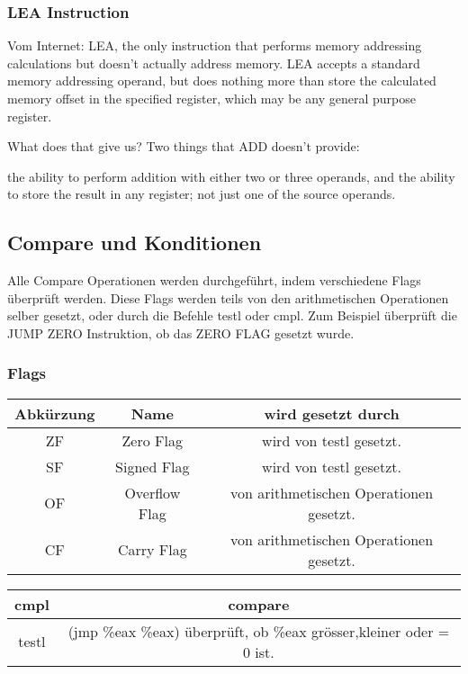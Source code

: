 \documentclass[a4paper, 11pt]{article}
\begin{document}
\subsubsection{LEA Instruction}
Vom Internet: LEA, the only instruction that performs memory addressing calculations but doesn't actually address memory. LEA accepts a standard memory addressing operand, but does nothing more than store the calculated memory offset in the specified register, which may be any general purpose register.

What does that give us? Two things that ADD doesn't provide:

the ability to perform addition with either two or three operands, and
the ability to store the result in any register; not just one of the source operands.

\subsection{Compare und Konditionen}
Alle Compare Operationen werden durchgeführt, indem verschiedene Flags überprüft werden. Diese Flags werden teils von den arithmetischen Operationen selber gesetzt, oder durch die Befehle testl oder cmpl. Zum Beispiel überprüft die JUMP ZERO Instruktion, ob das ZERO FLAG gesetzt wurde. 

\subsubsection{Flags}
\begin{tabular}{|c|c|c|}
	\hline
	Abkürzung & Name & wird gesetzt durch \\\hline 
	ZF & Zero Flag & wird von testl gesetzt.\\\hline
	SF & Signed Flag & wird von testl gesetzt.\\\hline
	OF & Overflow Flag & von arithmetischen Operationen gesetzt.\\\hline
	CF & Carry Flag & von arithmetischen Operationen gesetzt.\\\hline
\end{tabular}

\begin{tabular}{|c|c|}
	\hline
	cmpl & compare\\\hline
	testl & (jmp \%eax \%eax) überprüft, ob \%eax grösser,kleiner oder = 0 ist.\\\hline
\end{tabular}

\begin{tabular}{|c|c|}
	\hline
	

\end{tabular}
\end{document}
